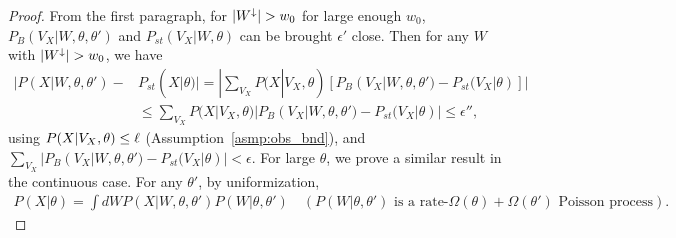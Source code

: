 \begin{proof}
From the first paragraph, for ${|W^\downarrow}| > w_{0}$ for 
large enough $w_0$,
$P_B(V_X | W, \theta, \theta')$ and  $P_{st}(V_X | W, \theta)$ can be
brought $\epsilon'$ close.
Then for any $W$ with ${|W^\downarrow}| > w_0$, we have
\begin{align*}
  |P(X|W , \theta, \theta') - & P_{st}(X | \theta)| = | \sum_{V_X} P(X|V_X, \theta) [P_B(V_X | W, \theta, \theta') -  P_{st}(V_X | \theta) ]|\\
& \leq \sum_{V_X} P(X | V_X, \theta)|P_B(V_X | W, \theta, \theta') -  P_{st}(V_X | \theta)|\le \epsilon'',
\end{align*}
using $P(X|V_X,\theta) \le \ell$ 
(Assumption~\ref{asmp:obs_bnd}), and 
$\sum_{V_X} |P_B(V_X | W, \theta, \theta') -  P_{st}(V_X | \theta)| < \epsilon$.
For large $\theta$, we prove a similar result in the continuous 
case. For any $\theta'$, by uniformization, 
\begin{align*}
P(X | \theta) %
= \int dW P(X | W, \theta, \theta') P(W | \theta, \theta') %
\quad 
(\text{$P(W|\theta,\theta')$ is a rate-$\Omega(\theta) + 
\Omega(\theta')$ Poisson process}).
\end{align*}

\end{proof}
